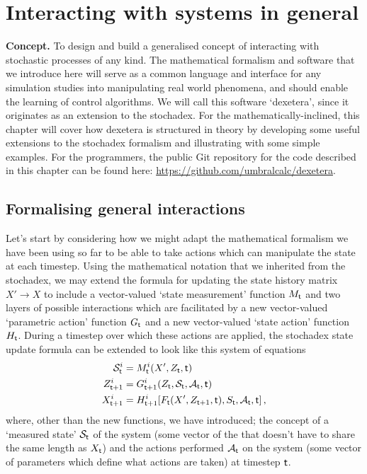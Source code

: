 \chapter{\sffamily Interacting with systems in general}

{\bfseries\sffamily Concept.} To design and build a generalised concept of interacting with stochastic processes of any kind. The mathematical formalism and software that we introduce here will serve as a common language and interface for any simulation studies into manipulating real world phenomena, and should enable the learning of control algorithms. We will call this software `dexetera', since it originates as an extension to the stochadex. For the mathematically-inclined, this chapter will cover how dexetera is structured in theory by developing some useful extensions to the stochadex formalism and illustrating with some simple examples. For the programmers, the public Git repository for the code described in this chapter can be found here: \href{https://github.com/umbralcalc/dexetera}{https://github.com/umbralcalc/dexetera}.

\section{\sffamily Formalising general interactions}

Let's start by considering how we might adapt the mathematical formalism we have been using so far to be able to take actions which can manipulate the state at each timestep. Using the mathematical notation that we inherited from the stochadex, we may extend the formula for updating the state history matrix $X'\rightarrow X$ to include a vector-valued `state measurement' function $M_{\sf t}$ and two layers of possible interactions which are facilitated by a new vector-valued `parametric action' function $G_{{\sf t}}$ and a new vector-valued `state action' function $H_{{\sf t}}$. During a timestep over which these actions are applied, the stochadex state update formula can be extended to look like this system of equations
\begin{align}
{\cal S}_{{\sf t}}^i &= M_{{\sf t}}^i(X', Z_{\sf t}, {\sf t}) \label{eq:generalised-state-measurement} \\
Z_{{\sf t}+1}^i &= G_{{\sf t}+1}^i(Z_{{\sf t}}, {\cal S}_{{\sf t}}, {\cal A}_{{\sf t}}, {\sf t}) \label{eq:generalised-param-actions} \\
X_{{\sf t}+1}^i &= H^i_{{\sf t}+1}[F_{\sf t}(X', Z_{{\sf t}+1}, {\sf t}), S_{\sf t}, {\cal A}_{\sf t}, {\sf t}] \label{eq:generalised-state-actions} \,,
\end{align}
where, other than the new functions, we have introduced; the concept of a `measured state' ${\cal S}_{{\sf t}}$ of the system (some vector of the that doesn't have to share the same length as $X_{\sf t}$) and the actions performed ${\cal A}_{{\sf t}}$ on the system (some vector of parameters which define what actions are taken) at timestep ${\sf t}$.

